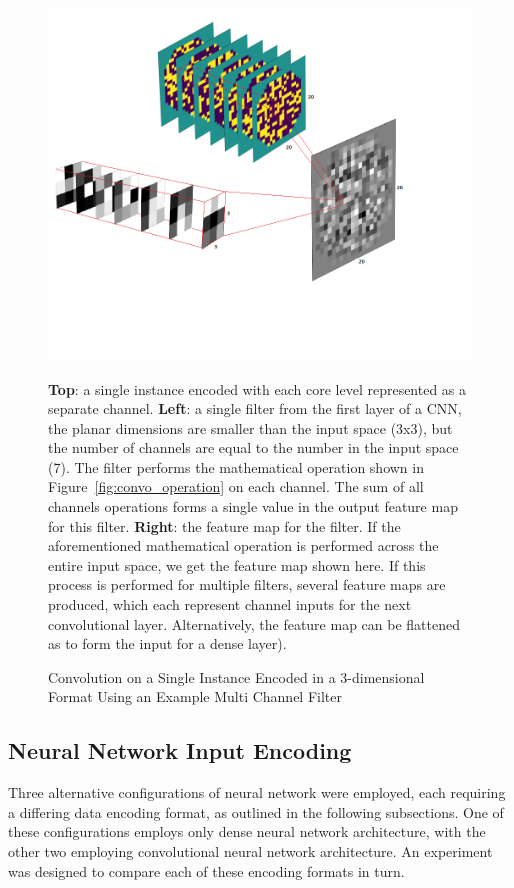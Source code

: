 \begin{figure}[p]
	\centering
	\includegraphics[scale=0.7]{Figures/convo_vis.png}
	\caption{Convolution on a Single Instance Encoded in a 3-dimensional Format Using an Example Multi Channel Filter} {\textbf{Top}: a single instance encoded with each core level represented as a separate channel. \textbf{Left}: a single filter from the first layer of a CNN, the planar dimensions are smaller than the input space (3x3), but the number of channels are equal to the number in the input space (7). The filter performs the mathematical operation shown in Figure~\ref{fig:convo_operation} on each channel. The sum of all channels operations forms a single value in the output feature map for this filter. \textbf{Right}: the feature map for the filter. If the aforementioned mathematical operation is performed across the entire input space, we get the feature map shown here. If this process is performed for multiple filters, several feature maps are produced, which each represent channel inputs for the next convolutional layer. Alternatively, the feature map can be flattened as to form the input for a dense layer). }
	\label{fig:feature_maps}
\end{figure}


\newpage
\subsection{Neural Network Input Encoding} \label{encoding_method}

Three alternative configurations of neural network were employed, each requiring a differing data encoding format, as outlined in the following subsections. One of these configurations employs only dense neural network architecture, with the other two employing convolutional neural network architecture.  An experiment was designed to compare each of these encoding formats in turn.
\\

